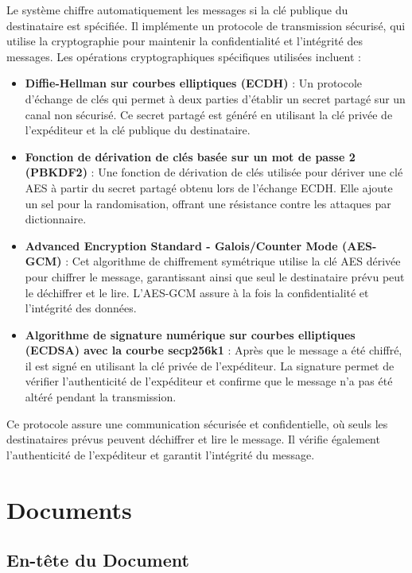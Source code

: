 Le système chiffre automatiquement les messages si la clé publique du destinataire est spécifiée. Il implémente un protocole de transmission sécurisé, qui utilise la cryptographie pour maintenir la confidentialité et l'intégrité des messages. Les opérations cryptographiques spécifiques utilisées incluent :

\begin{itemize}
  \item \textbf{Diffie-Hellman sur courbes elliptiques (ECDH)} : Un protocole d'échange de clés qui permet à deux parties d'établir un secret partagé sur un canal non sécurisé. Ce secret partagé est généré en utilisant la clé privée de l'expéditeur et la clé publique du destinataire.
  \item \textbf{Fonction de dérivation de clés basée sur un mot de passe 2 (PBKDF2)} : Une fonction de dérivation de clés utilisée pour dériver une clé AES à partir du secret partagé obtenu lors de l'échange ECDH. Elle ajoute un sel pour la randomisation, offrant une résistance contre les attaques par dictionnaire.
  \item \textbf{Advanced Encryption Standard - Galois/Counter Mode (AES-GCM)} : Cet algorithme de chiffrement symétrique utilise la clé AES dérivée pour chiffrer le message, garantissant ainsi que seul le destinataire prévu peut le déchiffrer et le lire. L'AES-GCM assure à la fois la confidentialité et l'intégrité des données.
  \item \textbf{Algorithme de signature numérique sur courbes elliptiques (ECDSA) avec la courbe secp256k1} : Après que le message a été chiffré, il est signé en utilisant la clé privée de l'expéditeur. La signature permet de vérifier l'authenticité de l'expéditeur et confirme que le message n'a pas été altéré pendant la transmission.
\end{itemize}

Ce protocole assure une communication sécurisée et confidentielle, où seuls les destinataires prévus peuvent déchiffrer et lire le message.
Il vérifie également l'authenticité de l'expéditeur et garantit l'intégrité du message.

\section{Documents}

\subsection{En-tête du Document \label{doc_header}}

